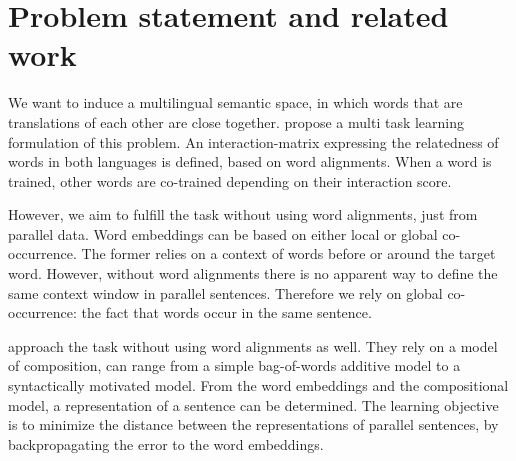 \documentclass[a4paper,11pt]{article}
\begin{document}





\section*{Problem statement and related work}
We want to induce a multilingual semantic space, in which words that are translations of each other are close together. 
\cite{klementiev2012inducing} propose a multi task learning formulation of this problem. An interaction-matrix expressing the relatedness of words in both languages is defined, based on word alignments. When a word is trained, other words are co-trained depending on their interaction score.

However, we aim to fulfill the task without using word alignments, just from parallel data. Word embeddings can be based on either local or global co-occurrence. The former relies on a context of words before or around the target word. However, without word alignments there is no apparent way to define the same context window in parallel sentences. Therefore we rely on global co-occurrence: the fact that words occur in the same sentence. 


\cite{hermann2014multilingual} approach the task without using word alignments as well. They rely on a model of composition, can range from a simple bag-of-words additive model to a syntactically motivated model. From the word embeddings and the compositional model, a representation of a sentence can be determined. The learning objective is to minimize the distance between the representations of parallel sentences, by backpropagating the error to the word embeddings.
\end{document}
